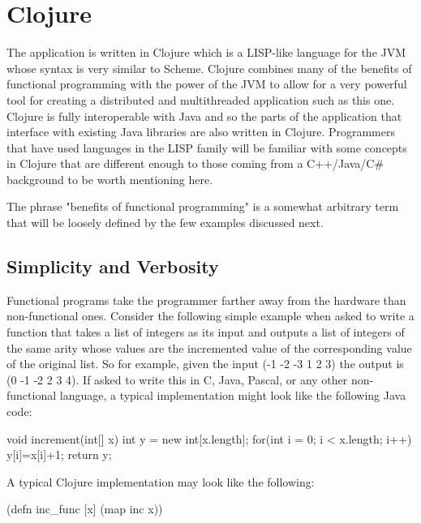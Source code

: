 \section{Clojure}
The application is written in Clojure which is a LISP-like language for the JVM whose syntax is very similar to Scheme.   
Clojure combines many of the benefits of functional programming with the power of the JVM to allow for a very 
powerful tool for creating a distributed and multithreaded application such as this one. 
Clojure is fully interoperable with Java and so the parts of the application that interface with existing Java libraries are also written in Clojure.
Programmers that have used languages in the LISP family will be familiar with some concepts in Clojure
that are different enough to those coming from a C++/Java/C# background to be worth mentioning here.









 
The phrase "benefits of functional programming" is a somewhat arbitrary term that will be loosely defined by the few examples
discussed next. 

\subsection{Simplicity and Verbosity}
Functional programs take the programmer farther away from the hardware than non-functional ones. Consider the following simple example when asked to write a function that takes a list of integers as its input and outputs a list of integers of the same arity whose values are the incremented value of the corresponding value of the original list. So for example, given the input (-1 -2 -3 1 2 3) the output is (0 -1 -2 2 3 4). If asked to write this in C, Java, Pascal, or any other non-functional language, a typical implementation might look like the following Java code: 

void increment(int[] x) {
	int y = new int[x.length];
	for(int i = 0; i < x.length; i++) { 
	  y[i]=x[i]+1;
         }
         return y;
}

A typical Clojure implementation may look like the following: 

(defn inc_func [x] (map inc x))

